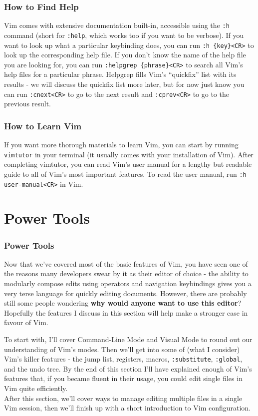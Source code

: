 \documentclass{beamer}
\begin{document}
\begin{frame}[fragile]
    \frametitle{How to Find Help}
    Vim comes with extensive documentation built-in, accessible using the \verb+:h+ command (short for \verb+:help+, which works too if you want to be verbose). If you want to look up what a particular keybinding does, you can run \verb+:h {key}<CR>+ to look up the corresponding help file. If you don't know the name of the help file you are looking for, you can run \verb+:helpgrep {phrase}<CR>+ to search all Vim's help files for a particular phrase. Helpgrep fills Vim's \enquote{quickfix} list with its results - we will discuss the quickfix list more later, but for now just know you can run \verb+:cnext<CR>+ to go to the next result and \verb+:cprev<CR>+ to go to the previous result.
\end{frame}

\begin{frame}[fragile]
    \frametitle{How to Learn Vim}
    If you want more thorough materials to learn Vim, you can start by running \verb+vimtutor+ in your terminal (it usually comes with your installation of Vim). After completing vimtutor, you can read Vim's user manual for a lengthy but readable guide to all of Vim's most important features. To read the user manual, run \verb+:h user-manual<CR>+ in Vim.
\end{frame}

\section{Power Tools}

\begin{frame}[fragile]
    \frametitle{Power Tools}
    \tableofcontents[currentsection]
\end{frame}

\begin{frame}[fragile]
    Now that we've covered most of the basic features of Vim, you have seen one of the reasons many developers swear by it as their editor of choice - the ability to modularly compose edits using operators and navigation keybindings gives you a very terse language for quickly editing documents. However, there are probably still some people wondering \textbf{why would anyone want to use this editor}? Hopefully the features I discuss in this section will help make a stronger case in favour of Vim.
\end{frame}

\begin{frame}[fragile]
    To start with, I'll cover Command-Line Mode and Visual Mode to round out our understanding of Vim's modes. Then we'll get into some of (what I consider) Vim's killer features - the jump list, registers, macros, \verb+:substitute+, \verb+:global+, and the undo tree. By the end of this section I'll have explained enough of Vim's features that, if you became fluent in their usage, you could edit single files in Vim quite efficiently. \\
    \vspace{0.5cm}
    After this section, we'll cover ways to manage editing multiple files in a single Vim session, then we'll finish up with a short introduction to Vim configuration.
\end{frame}
\end{document}
